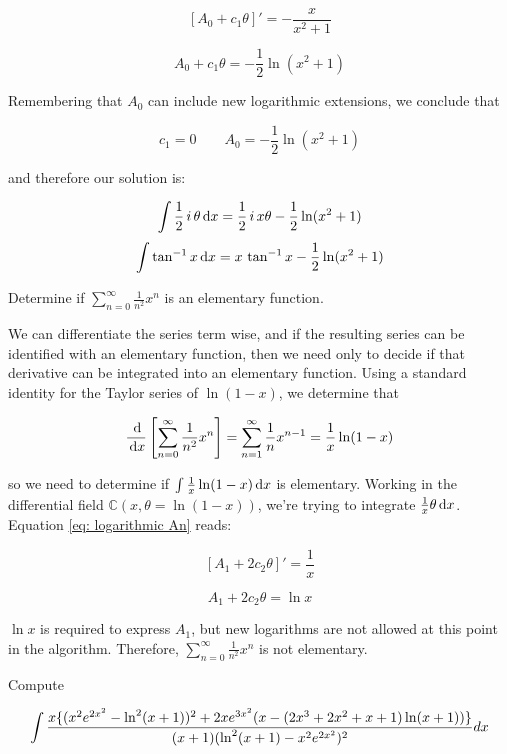 $$\left[ A_0 + c_1\theta \right]' = - \frac{x}{x^2+1}$$


$$A_0 + c_1\theta = - \frac{1}{2}\ln(x^2+1)$$

Remembering that $A_0$ can include new logarithmic extensions, we
conclude that

$$c_1 = 0 \qquad A_0 = - \frac{1}{2}\ln(x^2+1)$$

and therefore our solution is:

$$\int {1\over2}\,i\,\theta\, {\rm d}x = {1\over2}\,i\,x \theta - \frac{1}{2}\ln(x^2+1)$$
$$\int \tan^{-1} x\, {\rm d}x = x\,\tan^{-1} x - \frac{1}{2}\ln(x^2+1)$$


\endexample

\vfill\eject

\example Determine if $\sum_{n=0}^\infty \frac{1}{n^2} x^n$ is an elementary function.

We can differentiate the series term wise, and if the resulting series
can be identified with an elementary function, then we need only to
decide if that derivative can be integrated into an elementary
function.  Using a standard identity for the Taylor series of $\ln
(1-x)$, we determine that

$$\frac{\,\mathrm{d}}{\,\mathrm{d} x} \left[ \sum_{n=0}^\infty \frac{1}{n^2} x^n \right] = \sum_{n=1}^\infty \frac{1}{n} x^{n-1} = \frac{1}{x}\ln (1-x)$$

so we need to determine if $\int \frac{1}{x}\ln (1-x) \,\mathrm{d} x$ is elementary.  Working in the
differential field ${\mathbb C}(x,\theta = \ln (1-x))$, we're trying to integrate
$\frac{1}{x}\theta \,\mathrm{d} x$.  Equation \eqref{eq: logarithmic An} reads:

$$\left[ A_1 + 2 c_2 \theta \right]' = \frac{1}{x}$$

$$A_1 + 2 c_2 \theta = \ln x$$

$\ln x$ is required to express $A_1$, but new logarithms are not
allowed at this point in the algorithm.  Therefore,
$\sum_{n=0}^\infty \frac{1}{n^2} x^n$ is not elementary.

\endexample

\vfill\eject

\example\label{hard log-exp integral}
Compute


$$\int{{x\{(x^2e^{2x^2}-\ln^2(x+1))^2+2xe^{3x^2}(x-(2x^3+2x^2+x+1)\ln(x+1))\}}\over{(x+1)(\ln^2(x+1) - x^2e^{2x^2})^2}} dx$$

